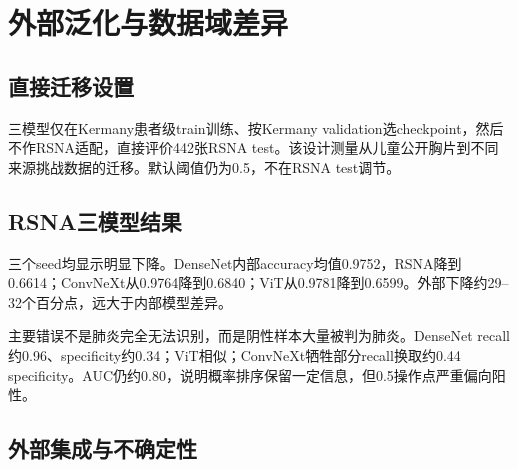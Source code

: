 \section{外部泛化与数据域差异}

\subsection{直接迁移设置}

三模型仅在Kermany患者级train训练、按Kermany validation选checkpoint，然后不作RSNA适配，直接评价442张RSNA test。该设计测量从儿童公开胸片到不同来源挑战数据的迁移。默认阈值仍为0.5，不在RSNA test调节。

\subsection{RSNA三模型结果}

三个seed均显示明显下降。DenseNet内部accuracy均值0.9752，RSNA降到0.6614；ConvNeXt从0.9764降到0.6840；ViT从0.9781降到0.6599。外部下降约29--32个百分点，远大于内部模型差异。

\begin{table}[H]
\centering
\caption{Kermany训练模型在RSNA test上的三seed结果}
\end{table}

主要错误不是肺炎完全无法识别，而是阴性样本大量被判为肺炎。DenseNet recall约0.96、specificity约0.34；ViT相似；ConvNeXt牺牲部分recall换取约0.44 specificity。AUC仍约0.80，说明概率排序保留一定信息，但0.5操作点严重偏向阳性。

\subsection{外部集成与不确定性}

